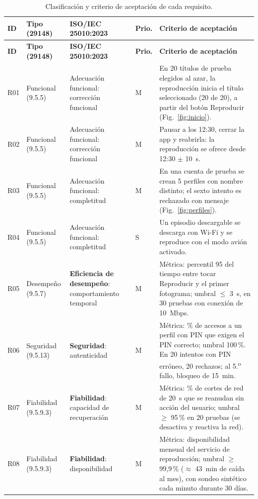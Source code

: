 \documentclass[11pt,a4paper]{article}
\begin{document}
\begin{longtable}{@{}p{0.9cm}p{2.2cm}p{3.1cm}p{0.8cm}p{7.6cm}@{}}
\caption{Clasificaci\'on y criterio de aceptaci\'on de cada requisito.}\label{tab:clasif}\\
\toprule
\textbf{ID} & \textbf{Tipo (29148)} & \textbf{ISO/IEC 25010:2023} & \textbf{Prio.} & \textbf{Criterio de aceptaci\'on}\\
\midrule\endfirsthead
\toprule
\textbf{ID} & \textbf{Tipo (29148)} & \textbf{ISO/IEC 25010:2023} & \textbf{Prio.} & \textbf{Criterio de aceptaci\'on}\\
\midrule\endhead
R01 & Funcional (9.5.5) & Adecuaci\'on funcional: correcci\'on funcional & M & En 20 t\'itulos de prueba elegidos al azar, la reproducci\'on inicia el t\'itulo seleccionado (20 de 20), a partir del bot\'on Reproducir (Fig.~\ref{fig:inicio}).\\
R02 & Funcional (9.5.5) & Adecuaci\'on funcional: correcci\'on funcional & M & Pausar a los 12:30, cerrar la app y reabrirla: la reproducci\'on se ofrece desde 12:30 $\pm$ 10~s.\\
R03 & Funcional (9.5.5) & Adecuaci\'on funcional: completitud & M & En una cuenta de prueba se crean 5 perfiles con nombre distinto; el sexto intento es rechazado con mensaje (Fig.~\ref{fig:perfiles}).\\
R04 & Funcional (9.5.5) & Adecuaci\'on funcional: completitud & S & Un episodio descargable se descarga con Wi-Fi y se reproduce con el modo avi\'on activado.\\
\midrule
R05 & Desempe\~no (9.5.7) & \textbf{Eficiencia de desempe\~no}: comportamiento temporal & M & M\'etrica: percentil 95 del tiempo entre tocar Reproducir y el primer fotograma; umbral $\le$ 3~s, en 30 pruebas con conexi\'on de 10~Mbps.\\
R06 & Seguridad (9.5.13) & \textbf{Seguridad}: autenticidad & M & M\'etrica: \% de accesos a un perfil con PIN que exigen el PIN correcto; umbral 100\,\%. En 20 intentos con PIN err\'oneo, 20 rechazos; al 5.\textsuperscript{o} fallo, bloqueo de 15~min.\\
R07 & Fiabilidad (9.5.9.3) & \textbf{Fiabilidad}: capacidad de recuperaci\'on & M & M\'etrica: \% de cortes de red de 20~s que se reanudan sin acci\'on del usuario; umbral $\ge$ 95\,\% en 20 pruebas (se desactiva y reactiva la red).\\
R08 & Fiabilidad (9.5.9.3) & \textbf{Fiabilidad}: disponibilidad & M & M\'etrica: disponibilidad mensual del servicio de reproducci\'on; umbral $\ge$ 99,9\,\% ($\approx$ 43~min de ca\'ida al mes), con sondeo sint\'etico cada minuto durante 30 d\'ias.\\

\end{longtable}
\end{document}
